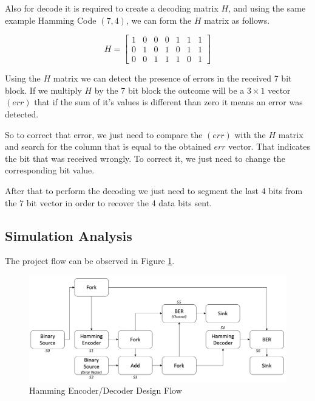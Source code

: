 \begin{refsection}
Also for decode it is required to create a decoding matrix $H$, and using the same example Hamming Code $(7, 4)$, we can form the $H$ matrix as follows.

\begin{equation}
H = \begin{bmatrix}
1 & 0 & 0 & 0 & 1 & 1 & 1 \\ 
0 & 1 & 0 & 1 & 0 & 1 & 1 \\ 
0 & 0 & 1 & 1 & 1 & 0 & 1
\end{bmatrix}
\end{equation}

Using the $H$ matrix we can detect the presence of errors in the received 7 bit block. If we multiply $H$ by the 7 bit block the outcome will be a $3 \times 1$ vector $(err)$ that if the sum of it's values is different than zero it means an error was detected.

So to correct that error, we just need to compare the $(err)$ with the $H$ matrix and search for the column that is equal to the obtained $err$ vector. That indicates the bit that was received wrongly. To correct it, we just need to change the corresponding bit value.

After that to perform the decoding we just need to segment the last 4 bits from the 7 bit vector in order to recover the 4 data bits sent.

\subsection{Simulation Analysis}

The project flow can be observed in Figure \ref{fig:hammingEncoderDecoder}.

\begin{figure}[h!]
	\vspace{-3mm}
	\centering
	\includegraphics[width=.9\linewidth]{./sdf/eit_25828_hamming_channel_encoder_decoder/images/blockDesign.png}
	\vspace{-3mm}
	\caption{Hamming Encoder/Decoder Design Flow}
	\label{fig:hammingEncoderDecoder}
	\vspace{-3mm}
\end{figure}


\end{refsection}
